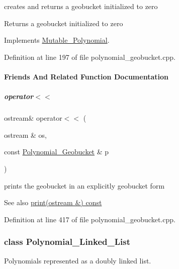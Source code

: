 creates and returns a geobucket initialized to zero 

\begin{DoxyReturn}{Returns}
a geobucket initialized to zero 
\end{DoxyReturn}


Implements \hyperlink{group__polygroup_aa7a14a4cbb110840e55d656d7c6fe3ff}{Mutable\+\_\+\+Polynomial}.



Definition at line 197 of file polynomial\+\_\+geobucket.\+cpp.



\paragraph{Friends And Related Function Documentation}
\mbox{\label{group__polygroup_af97062198c6ade3e8d3077308e89669d}} 
\subparagraph{\texorpdfstring{operator$<$$<$}{operator<<}}
{\footnotesize\ttfamily ostream\& operator$<$$<$ (\begin{DoxyParamCaption}\item[{ostream \&}]{os,  }\item[{const \hyperlink{group__polygroup_class_polynomial___geobucket}{Polynomial\+\_\+\+Geobucket} \&}]{p }\end{DoxyParamCaption})\hspace{0.3cm}{\ttfamily [friend]}}



prints the geobucket in an explicitly geobucket form 

\begin{DoxySeeAlso}{See also}
\hyperlink{group__polygroup_a3c8cb0c53e9acf4d60345fb4b4dbb807}{print(ostream \&) const} 
\end{DoxySeeAlso}


Definition at line 417 of file polynomial\+\_\+geobucket.\+cpp.

\label{class_polynomial___linked___list}
\subsubsection{class Polynomial\+\_\+\+Linked\+\_\+\+List}
Polynomials represented as a doubly linked list. 

